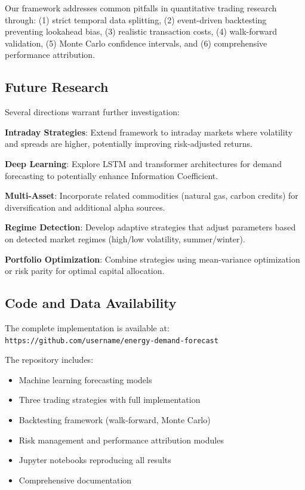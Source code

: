 \documentclass[12pt,a4paper]{article}
\begin{document}
Our framework addresses common pitfalls in quantitative trading research through: (1) strict temporal data splitting, (2) event-driven backtesting preventing lookahead bias, (3) realistic transaction costs, (4) walk-forward validation, (5) Monte Carlo confidence intervals, and (6) comprehensive performance attribution.

\subsection{Future Research}

Several directions warrant further investigation:

\textbf{Intraday Strategies}: Extend framework to intraday markets where volatility and spreads are higher, potentially improving risk-adjusted returns.

\textbf{Deep Learning}: Explore LSTM and transformer architectures for demand forecasting to potentially enhance Information Coefficient.

\textbf{Multi-Asset}: Incorporate related commodities (natural gas, carbon credits) for diversification and additional alpha sources.

\textbf{Regime Detection}: Develop adaptive strategies that adjust parameters based on detected market regimes (high/low volatility, summer/winter).

\textbf{Portfolio Optimization}: Combine strategies using mean-variance optimization or risk parity for optimal capital allocation.

\subsection{Code and Data Availability}

The complete implementation is available at: \texttt{https://github.com/username/energy-demand-forecast}

The repository includes:
\begin{itemize}
    \item Machine learning forecasting models
    \item Three trading strategies with full implementation
    \item Backtesting framework (walk-forward, Monte Carlo)
    \item Risk management and performance attribution modules
    \item Jupyter notebooks reproducing all results
    \item Comprehensive documentation
\end{itemize}
\end{document}
